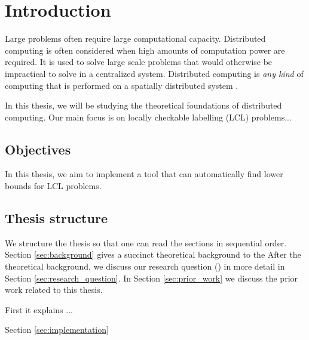 
\section{Introduction}  \label{sec:introduction}

Large problems often require large computational capacity.
Distributed computing is often considered when high amounts of computation power are required.
It is used to solve large scale problems that would otherwise be impractical to solve in a centralized system.
Distributed computing is \emph{any kind} of computing that is performed on a spatially distributed system
\cite{DBLP:books/el/leeuwen90/LamportL90}.

In this thesis, we will be studying the theoretical foundations of distributed computing.
Our main focus is on locally checkable labelling (LCL) problems...



\subsection{Objectives}
In this thesis, we aim to implement a tool that can automatically find lower bounds for LCL problems.

\subsection{Thesis structure}
We structure the thesis so that one can read the sections in sequential order.
Section \ref{sec:background} gives a succinct theoretical background to the 
After the theoretical background, we discuss our research question () in more detail in Section \ref{sec:research_question}.
In Section \ref{sec:prior_work} we discuss the prior work related to this thesis.


First it explains ... %

Section \ref{sec:implementation}
